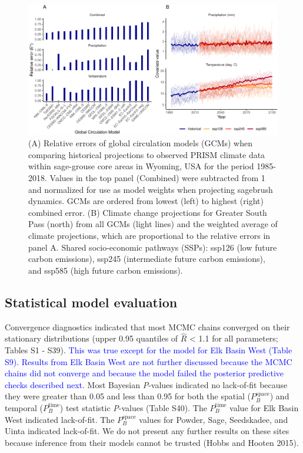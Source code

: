 \documentclass[
  12pt,
]{article}
\begin{document}
\begin{figure}
\centering
\includegraphics{sageCastManuscript_files/figure-latex/gcm-ranks-1.pdf}
\caption{\label{fig:gcm-ranks}(A) Relative errors of global circulation models (GCMs) when comparing historical projections to observed PRISM climate data within sage-grouse core areas in Wyoming, USA for the period 1985-2018. Values in the top panel (Combined) were subtracted from 1 and normalized for use as model weights when projecting sagebrush dynamics. GCMs are ordered from lowest (left) to highest (right) combined error. (B) Climate change projections for Greater South Pass (north) from all GCMs (light lines) and the weighted average of climate projections, which are proportional to the relative errors in panel A. Shared socio-economic pathways (SSPs): ssp126 (low future carbon emissions), ssp245 (intermediate future carbon emissions), and ssp585 (high future carbon emissions).}
\end{figure}

\hypertarget{statistical-model-evaluation}{%
\subsection{Statistical model evaluation}\label{statistical-model-evaluation}}

Convergence diagnostics indicated that most MCMC chains converged on their stationary distributions (upper 0.95 quantiles of \(\hat{R}\) \textless{} 1.1 for all parameters; Tables S1 - S39).
\textcolor{blue}{This was true except for the model for Elk Basin West (Table S9).}
\textcolor{blue}{Results from Elk Basin West are not further discussed because the MCMC chains did not converge and because the model failed the posterior predictive checks described next.}
Most Bayesian \emph{P}-values indicated no lack-of-fit because they were greater than 0.05 and less than 0.95 for both the spatial (\(P_B^{\text{space}}\)) and temporal (\(P_B^{\text{time}}\)) test statistic \emph{P}-values (Table S40).
The \(P_B^{\text{time}}\) value for Elk Basin West indicated lack-of-fit.
The \(P_B^{\text{space}}\) values for Powder, Sage, Seedskadee, and Uinta indicated lack-of-fit.
We do not present any further results on these sites because inference from their models cannot be trusted (Hobbs and Hooten 2015).
\end{document}
